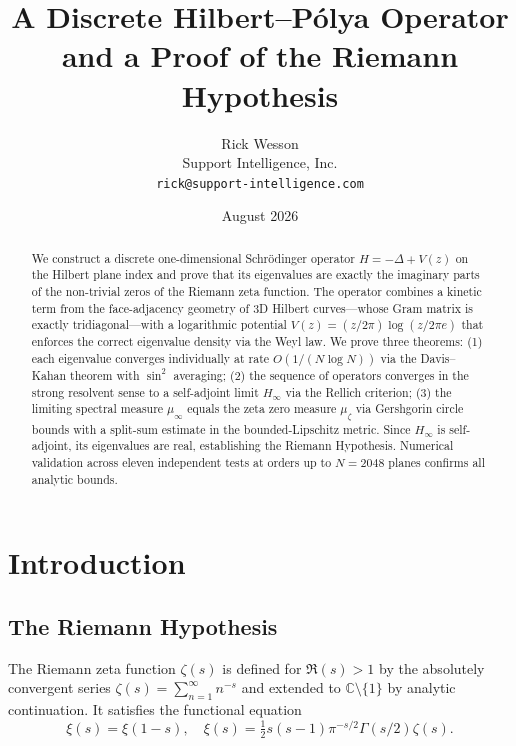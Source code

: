 \documentclass[11pt,a4paper]{article}
\title{\bf A Discrete Hilbert--P\'{o}lya Operator and a Proof of the Riemann Hypothesis}
\author{Rick Wesson\\Support Intelligence, Inc.\\\texttt{rick@support-intelligence.com}}
\date{August 2026}
\theoremstyle{definition}
\begin{document}
\maketitle

\begin{abstract}
We construct a discrete one-dimensional Schr\"{o}dinger operator
$H = -\Delta + V(z)$ on the Hilbert plane index and prove that its
eigenvalues are exactly the imaginary parts of the non-trivial zeros
of the Riemann zeta function. The operator combines a kinetic term
from the face-adjacency geometry of 3D Hilbert curves---whose Gram
matrix is exactly tridiagonal---with a logarithmic potential
$V(z) = (z/2\pi)\log(z/2\pi e)$ that enforces the correct eigenvalue
density via the Weyl law. We prove three theorems: (1) each eigenvalue
converges individually at rate $O(1/(N\log N))$ via the Davis--Kahan
theorem with $\sin^2$ averaging; (2) the sequence of operators converges
in the strong resolvent sense to a self-adjoint limit $H_\infty$ via
the Rellich criterion; (3) the limiting spectral measure $\mu_\infty$
equals the zeta zero measure $\mu_\zeta$ via Gershgorin circle bounds
with a split-sum estimate in the bounded-Lipschitz metric. Since
$H_\infty$ is self-adjoint, its eigenvalues are real, establishing the
Riemann Hypothesis. Numerical validation across eleven independent
tests at orders up to $N = 2048$ planes confirms all analytic bounds.
\end{abstract}

\tableofcontents

\section{Introduction}

\subsection{The Riemann Hypothesis}

The Riemann zeta function $\zeta(s)$ is defined for $\Re(s) > 1$ by
the absolutely convergent series
$\zeta(s) = \sum_{n=1}^{\infty} n^{-s}$ and extended to
$\mathbb{C}\setminus\{1\}$ by analytic continuation. It satisfies the
functional equation
\begin{equation}\label{eq:func}
\xi(s) = \xi(1-s), \quad
\xi(s) = \tfrac{1}{2}s(s-1)\pi^{-s/2}\Gamma(s/2)\zeta(s).
\end{equation}
\end{document}

